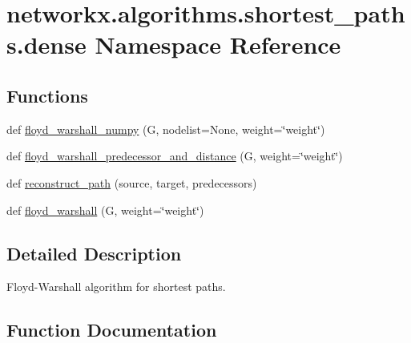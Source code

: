 \hypertarget{namespacenetworkx_1_1algorithms_1_1shortest__paths_1_1dense}{}\section{networkx.\+algorithms.\+shortest\+\_\+paths.\+dense Namespace Reference}
\label{namespacenetworkx_1_1algorithms_1_1shortest__paths_1_1dense}
\subsection*{Functions}
\begin{DoxyCompactItemize}
\item 
def \hyperlink{namespacenetworkx_1_1algorithms_1_1shortest__paths_1_1dense_a0f0fbabf2673e685c7e349ed13c2917b}{floyd\+\_\+warshall\+\_\+numpy} (G, nodelist=None, weight=\char`\"{}weight\char`\"{})
\item 
def \hyperlink{namespacenetworkx_1_1algorithms_1_1shortest__paths_1_1dense_a720bd1dfc4a1a191a840459462076a09}{floyd\+\_\+warshall\+\_\+predecessor\+\_\+and\+\_\+distance} (G, weight=\char`\"{}weight\char`\"{})
\item 
def \hyperlink{namespacenetworkx_1_1algorithms_1_1shortest__paths_1_1dense_a1bba22b986bd6f786d0e44dc150339e9}{reconstruct\+\_\+path} (source, target, predecessors)
\item 
def \hyperlink{namespacenetworkx_1_1algorithms_1_1shortest__paths_1_1dense_aabb334ccd160008dc9b6e788357978db}{floyd\+\_\+warshall} (G, weight=\char`\"{}weight\char`\"{})
\end{DoxyCompactItemize}


\subsection{Detailed Description}
\begin{DoxyVerb}Floyd-Warshall algorithm for shortest paths.
\end{DoxyVerb}
 

\subsection{Function Documentation}
\mbox{\label{namespacenetworkx_1_1algorithms_1_1shortest__paths_1_1dense_aabb334ccd160008dc9b6e788357978db}} 

